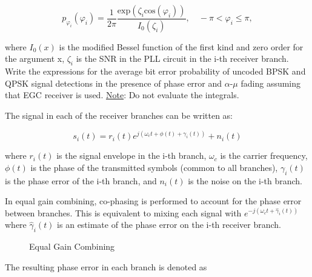 \documentclass[fleqn]{article}
\makeatletter
\newenvironment{equationCenter}{\@fleqnfalse\begin{equation*}}{\end{equation*}}
\makeatother
\begin{document}
\begin{enumerate}
		\begin{equationCenter}
			p_{\varphi_i}(\varphi_i) = \frac{1}{2\pi}\frac{\text{exp}(\zeta_i\text{cos}(\varphi_i))}{I_0(\zeta_i)}, \quad -\pi < \varphi_i \leq \pi,
		\end{equationCenter}
		
		where $I_0(x)$ is the modified Bessel function of the first kind and zero order for the argument x, $\zeta_i$ is the SNR in the PLL circuit in the i-th receiver branch. Write the expressions for the average bit error probability of uncoded BPSK and QPSK signal detections in the presence of phase error and $\alpha$-$\mu$ fading assuming that EGC receiver is used. \underline{Note}: Do not evaluate the integrals.
		
		The signal in each of the receiver branches can be written as:
		
		\begin{equation*}
			s_i(t) = r_i(t)e^{j(\omega_ct + \phi(t) + \gamma_i(t))} + n_i(t)
		\end{equation*}
		
		where $r_i(t)$ is the signal envelope in the i-th branch, $\omega_c$ is the carrier frequency, $\phi(t)$ is the phase of the transmitted symbols (common to all branches), $\gamma_i(t)$ is the phase error of the i-th branch, and $n_i(t)$ is the noise on the i-th branch.
		
		In equal gain combining, co-phasing is performed to account for the phase error between branches. This is equivalent to mixing each signal with $e^{-j(\omega_ct + \hat{\gamma}_i(t))}$ where $\hat{\gamma}_i(t)$ is an estimate of the phase error on the i-th receiver branch.
		
		\begin{figure}[H]
			\centerline{}
			\caption{Equal Gain Combining}
			\label{fig::equal_gain_combining}
		\end{figure}
		
		The resulting phase error in each branch is denoted as
		

\end{enumerate}
\end{document}

